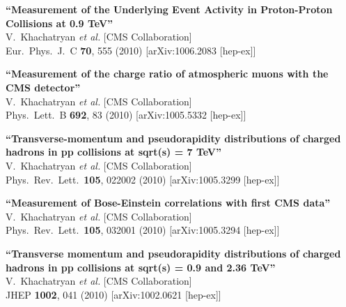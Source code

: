 \documentclass[10pt, a4paper]{article}
\begin{document}
\begin{thebibliography}{599}
{\bf ``Measurement of the Underlying Event Activity in Proton-Proton Collisions at 0.9 TeV''}
  \\{}V.~Khachatryan {\it et al.}  [CMS Collaboration]
  \\{}Eur.\ Phys.\ J.\  C {\bf 70}, 555 (2010)
  [arXiv:1006.2083 [hep-ex]]

{\bf ``Measurement of the charge ratio of atmospheric muons with the CMS detector''}
  \\{}V.~Khachatryan {\it et al.}  [CMS Collaboration]
  \\{}Phys.\ Lett.\  B {\bf 692}, 83 (2010)
  [arXiv:1005.5332 [hep-ex]]

{\bf ``Transverse-momentum and pseudorapidity distributions of charged hadrons in pp collisions at sqrt(s) = 7 TeV''}
  \\{}V.~Khachatryan {\it et al.}  [CMS Collaboration]
  \\{}Phys.\ Rev.\ Lett.\  {\bf 105}, 022002 (2010)
  [arXiv:1005.3299 [hep-ex]]

{\bf ``Measurement of Bose-Einstein correlations with first CMS data''}
  \\{}V.~Khachatryan {\it et al.}  [CMS Collaboration]
  \\{}Phys.\ Rev.\ Lett.\  {\bf 105}, 032001 (2010)
  [arXiv:1005.3294 [hep-ex]]

{\bf ``Transverse momentum and pseudorapidity distributions of charged hadrons in pp collisions at sqrt(s) = 0.9 and 2.36 TeV''}
  \\{}V.~Khachatryan {\it et al.}  [CMS Collaboration]
  \\{}JHEP {\bf 1002}, 041 (2010)
  [arXiv:1002.0621 [hep-ex]]


\end{thebibliography}
\end{document}
